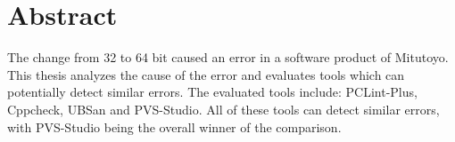 \chapter*{Abstract}
\label{ch:abstract}

The change from 32 to 64 bit caused an error in a software product of Mitutoyo. \newline
This thesis analyzes the cause of the error and evaluates tools which can potentially detect similar errors. \newline
The evaluated tools include: PCLint-Plus, Cppcheck, UBSan and PVS-Studio. All of these tools can detect similar errors, with PVS-Studio being the overall winner of the comparison.